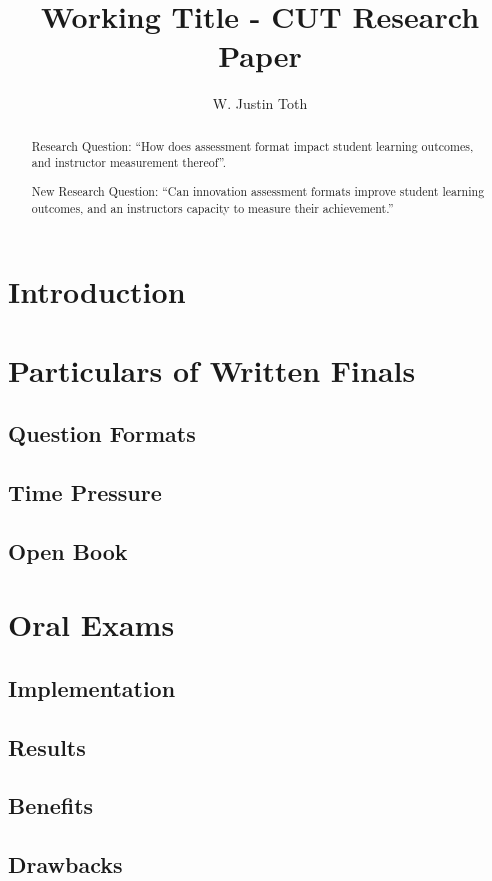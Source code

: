 \documentclass{article}
\title{Working Title - CUT Research Paper}
\author{W. Justin Toth}
\begin{document}
\maketitle
\begin{abstract}
Research Question: ``How does assessment format impact student learning outcomes, and instructor measurement thereof''.

New Research Question: ``Can innovation assessment formats improve student learning outcomes, and an instructors capacity to measure their achievement.''
\end{abstract}

\section{Introduction}

\section{Particulars of Written Finals}
\subsection{Question Formats}
\subsection{Time Pressure}
\subsection{Open Book}

\section{Oral Exams}
\subsection{Implementation}
\subsection{Results}
\subsection{Benefits}
\subsection{Drawbacks}
\end{document}
